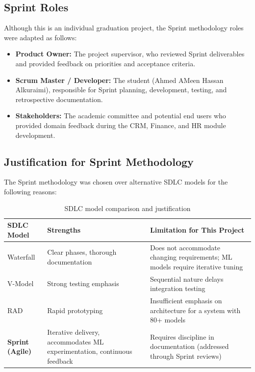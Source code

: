 \documentclass[12pt,a4paper]{report}
\begin{document}
\subsection{Sprint Roles}

Although this is an individual graduation project, the Sprint methodology roles were adapted as follows:

\begin{itemize}
  \item \textbf{Product Owner:} The project supervisor, who reviewed Sprint deliverables and provided feedback on priorities and acceptance criteria.
  \item \textbf{Scrum Master / Developer:} The student (Ahmed AMeen Hassan Alkuraimi), responsible for Sprint planning, development, testing, and retrospective documentation.
  \item \textbf{Stakeholders:} The academic committee and potential end users who provided domain feedback during the CRM, Finance, and HR module development.
\end{itemize}

\subsection{Justification for Sprint Methodology}

The Sprint methodology was chosen over alternative SDLC models for the following reasons:

\begin{table}[H]
\centering
\caption{SDLC model comparison and justification}
\label{tab:sdlc_comparison}
\begin{tabularx}{\textwidth}{l >{\raggedright\arraybackslash}X >{\raggedright\arraybackslash}X}
\toprule
\textbf{SDLC Model} & \textbf{Strengths} & \textbf{Limitation for This Project} \\
\midrule
Waterfall & Clear phases, thorough documentation & Does not accommodate changing requirements; ML models require iterative tuning \\
\addlinespace
V-Model & Strong testing emphasis & Sequential nature delays integration testing \\
\addlinespace
RAD & Rapid prototyping & Insufficient emphasis on architecture for a system with 80+ models \\
\addlinespace
\textbf{Sprint (Agile)} & Iterative delivery, accommodates ML experimentation, continuous feedback & Requires discipline in documentation (addressed through Sprint reviews) \\
\bottomrule
\end{tabularx}
\end{table}
\end{document}
